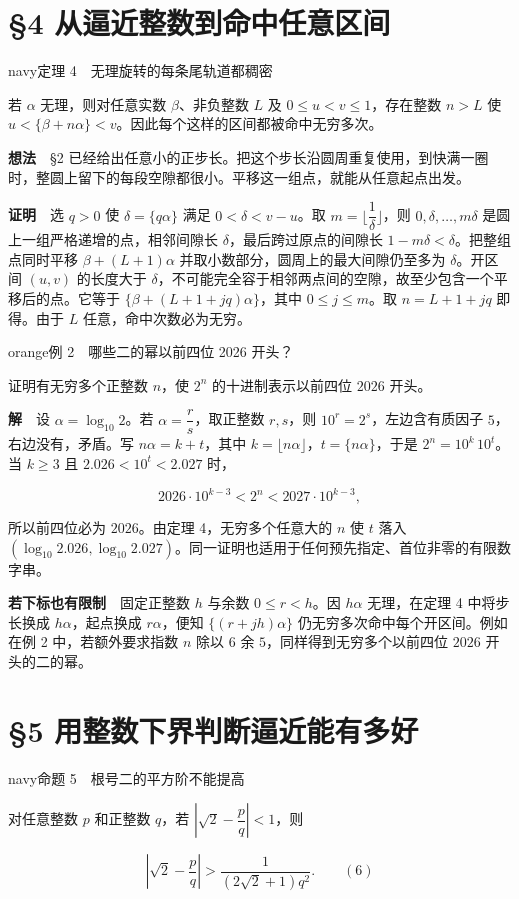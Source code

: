 \documentclass[11pt,a4paper]{article}
\newcommand{\articleheading}[1]{\section{#1}}
\begin{document}
\clearpage\articleheading{§4 从逼近整数到命中任意区间}

\begin{sboxenv}{navy}{定理 4　无理旋转的每条尾轨道都稠密}

若 $\alpha$ 无理，则对任意实数 $\beta$、非负整数 $L$ 及 $0\le u<v\le1$，存在整数 $n>L$ 使 $u<\{\beta+n\alpha\}<v$。因此每个这样的区间都被命中无穷多次。
\end{sboxenv}

\textbf{想法}　§2 已经给出任意小的正步长。把这个步长沿圆周重复使用，到快满一圈时，整圆上留下的每段空隙都很小。平移这一组点，就能从任意起点出发。

\textbf{证明}　选 $q>0$ 使 $\delta=\{q\alpha\}$ 满足 $0<\delta<v-u$。取 $m=\lfloor\dfrac1\delta\rfloor$，则 $0,\delta,\ldots,m\delta$ 是圆上一组严格递增的点，相邻间隙长 $\delta$，最后跨过原点的间隙长 $1-m\delta<\delta$。把整组点同时平移 $\beta+(L+1)\alpha$ 并取小数部分，圆周上的最大间隙仍至多为 $\delta$。开区间 $(u,v)$ 的长度大于 $\delta$，不可能完全容于相邻两点间的空隙，故至少包含一个平移后的点。它等于 $\{\beta+(L+1+jq)\alpha\}$，其中 $0\le j\le m$。取 $n=L+1+jq$ 即得。由于 $L$ 任意，命中次数必为无穷。

\begin{sboxenv}{orange}{例 2　哪些二的幂以前四位 2026 开头？}

证明有无穷多个正整数 $n$，使 $2^n$ 的十进制表示以前四位 $2026$ 开头。
\end{sboxenv}

\textbf{解}　设 $\alpha=\log_{10}2$。若 $\alpha=\dfrac rs$，取正整数 $r,s$，则 $10^r=2^s$，左边含有质因子 $5$，右边没有，矛盾。写 $n\alpha=k+t$，其中 $k=\lfloor n\alpha\rfloor$，$t=\{n\alpha\}$，于是 $2^n=10^k\,10^t$。当 $k\ge3$ 且 $2.026<10^t<2.027$ 时，

\[
2026\cdot10^{k-3}<2^n<2027\cdot10^{k-3},
\]

所以前四位必为 $2026$。由定理 4，无穷多个任意大的 $n$ 使 $t$ 落入 $(\log_{10}2.026,\log_{10}2.027)$。同一证明也适用于任何预先指定、首位非零的有限数字串。

\textbf{若下标也有限制}　固定正整数 $h$ 与余数 $0\le r<h$。因 $h\alpha$ 无理，在定理 4 中将步长换成 $h\alpha$，起点换成 $r\alpha$，便知 $\{(r+jh)\alpha\}$ 仍无穷多次命中每个开区间。例如在例 2 中，若额外要求指数 $n$ 除以 $6$ 余 $5$，同样得到无穷多个以前四位 $2026$ 开头的二的幂。

\clearpage\articleheading{§5 用整数下界判断逼近能有多好}

\begin{sboxenv}{navy}{命题 5　根号二的平方阶不能提高}

对任意整数 $p$ 和正整数 $q$，若 $|\sqrt2-\dfrac pq|<1$，则

\[
\left|\sqrt2-\frac pq\right|>\frac{1}{(2\sqrt2+1)q^2}.\qquad\mathrm{(6)}
\]
\end{sboxenv}
\end{document}

